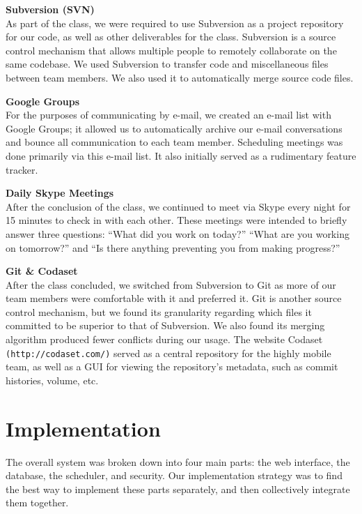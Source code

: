 \documentclass[12pt]{article}
\begin{document}
\begin{description}
\item{\textbf{Subversion (SVN)}} \\As part of the class, we were required to use Subversion as a project repository for our code, as well as other deliverables for the class. Subversion is a source control mechanism that allows multiple people to remotely collaborate on the same codebase. We used Subversion to transfer code and miscellaneous files between team members. We also used it to automatically merge source code files.
\item{\textbf{Google Groups}} \\For the purposes of communicating by e-mail, we created an e-mail list with Google Groups; it allowed us to automatically archive our e-mail conversations and bounce all communication to each team member. Scheduling meetings was done primarily via this e-mail list. It also initially served as a rudimentary feature tracker.
\item{\textbf{Daily Skype Meetings}} \\After the conclusion of the class, we continued to meet via Skype every night for 15 minutes to check in with each other. These meetings were intended to briefly answer three questions: ``What did you work on today?'' ``What are you working on tomorrow?'' and ``Is there anything preventing you from making progress?''
\item{\textbf{Git \& Codaset}} \\After the class concluded, we switched from Subversion to Git as more of our team members were comfortable with it and preferred it. Git is another source control mechanism, but we found its granularity regarding which files it committed to be superior to that of Subversion. We also found its merging algorithm produced fewer conflicts during our usage. The website Codaset \texttt{(http://codaset.com/)} served as a central repository for the highly mobile team, as well as a GUI for viewing the repository's metadata, such as commit histories, volume, etc.
\end{description}

\section{Implementation} %

The overall system was broken down into four main parts: the web interface, the database, the scheduler, and security. Our implementation strategy was to find the best way to implement these parts separately, and then collectively integrate them together.
\end{document}
